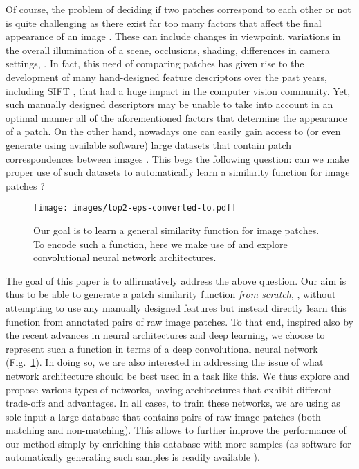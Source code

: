 \documentclass[10pt,twocolumn,letterpaper]{article}
\newcommand*{\USEIMAGES}{}
\begin{document}
Of course, the problem of deciding if two patches correspond to each other or not is  quite challenging  as there exist far too many factors that affect the final appearance of an image \cite{nowak:hal-00203958}. These can include changes in viewpoint, variations in the overall illumination of a scene, occlusions, shading, differences in camera settings, \etc.
In fact, this need of comparing patches has given rise to the development of many hand-designed feature descriptors over the past years, including SIFT \cite{LoweSift}, that had a huge impact in the computer vision community.
Yet, such manually designed descriptors may be unable
to take into account in an optimal manner all of the aforementioned factors that determine the appearance of a patch. On the other hand, nowadays one can easily gain access to (or even generate using available software) large datasets that contain  patch correspondences between images      \cite{photo_collections}.
 This begs the following question: can we make proper use of such datasets to automatically
learn a similarity function for image patches ?

\ifdefined\USEIMAGES
\begin{figure}
\small
\begin{center}
\texttt{[image: images/top2-eps-converted-to.pdf]}
\end{center}
\vspace{-7pt}
\caption{Our goal is to learn a  general similarity function for image patches. To encode such a function, here we make use of   and explore convolutional neural network architectures.}
\label{fig:intro}
\small
\vspace{-13pt}
\end{figure}
\fi

The goal of this paper is to affirmatively address the above question. Our aim is thus to be able to generate a patch similarity function \emph{from scratch}, \ie, without attempting to use any manually designed features but instead directly learn this function from annotated pairs of  raw image patches. To that end, inspired also by the recent advances in  neural architectures and  deep learning, we choose to represent such a function in terms of a deep convolutional neural network \cite{lecun-88, kriz2012} (Fig.~\ref{fig:intro}). In doing so, we are also interested in addressing the  issue of what   network architecture should  be best used in a task like this. We thus explore and propose various types of networks, having  architectures that  exhibit different trade-offs and advantages.
 In all  cases, to train these networks, we are using as  sole input a large database  that contains pairs of raw image patches (both matching and
non-matching).
This  allows to further improve the performance of our method  simply by enriching this database with more samples 
(as  software for automatically generating such samples is readily available  \cite{photo_tourism}).
\end{document}
